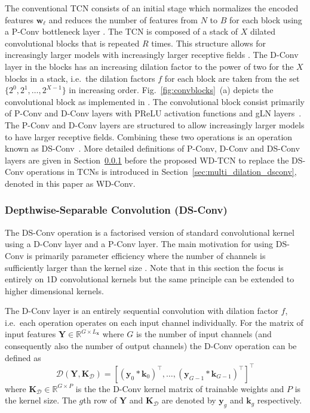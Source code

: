 \documentclass{article}
\newcommand{\vek}[1]{\ensuremath{\mathbf{#1}}}    \newcommand{\vekc}[1]{\ensuremath{\boldsymbol{\mathcal{#1}}}}
\newcommand{\Real}{\mathbb{R}}
\begin{document}
The conventional \ac{TCN} consists of an initial stage which normalizes the encoded features $\vek{w}_\ell$ and reduces the number of features from $N$ to $B$ for each block using a \ac{P-Conv} bottleneck layer \cite{convtasnet}.
The \ac{TCN} is composed of a stack of $X$ dilated convolutional blocks that is repeated $R$ times. This structure allows for increasingly larger models with increasingly larger receptive fields \cite{rfield}. The \ac{D-Conv} layer in the blocks has an increasing dilation factor to the power of two for the $X$ blocks in a stack, i.e.~the dilation factors $f$ for each block are taken from the set $\{2^0,2^1,\ldots,2^{X-1}\}$ in increasing order. Fig.~\ref{fig:convblocks}~(a) depicts the convolutional block as implemented in \cite{speechbrain,atttasnet}. 
The convolutional block consist primarily of \ac{P-Conv} and \ac{D-Conv} layers with \ac{PReLU} activation functions \cite{prelu} and \ac{gLN} layers~\cite{convtasnet}. The \ac{P-Conv} and \ac{D-Conv} layers are structured to allow increasingly larger models to have larger receptive fields. Combining these two operations is an operation known as \ac{DS-Conv}~\cite{convtasnet}. More detailed definitions of \ac{P-Conv}, \ac{D-Conv} and \ac{DS-Conv} layers are given in Section~\ref{sec:dsconv} before the proposed \ac{WD-TCN} to replace the \ac{DS-Conv} operations in \acp{TCN} is introduced in Section~\ref{sec:multi_dilation_dsconv}, denoted in this paper as \ac{WD-Conv}.
\subsubsection{Depthwise-Separable Convolution (DS-Conv)}
\label{sec:dsconv}
The \ac{DS-Conv} operation is a factorised version of standard convolutional kernel using a \ac{D-Conv} layer and a \ac{P-Conv} layer. The main motivation for using \ac{DS-Conv} is primarily parameter efficiency where the number of channels is sufficiently larger than the kernel size \cite{convtasnet}. Note that in this section the focus is entirely on 1D convolutional kernels but the same principle can be extended to higher dimensional kernels.

The \ac{D-Conv} layer is an entirely sequential convolution with dilation factor $f$, i.e.~each operation operates on each input channel individually. For the matrix of input features $\vek{Y}\in\Real^{G \times L_{\vek{x}}}$ where $G$ is the number of input channels (and consequently also the number of output channels) the \ac{D-Conv} operation can be defined as
\begin{equation}
    \mathcal{D}(\vek{Y},\vek{K}_{\mathcal{D}})=\left[(\vek{y}_0 * {\vek{k}}_0)^{\top},\ldots,({\vek{y}}_{G-1} * {\vek{k}}_{G-1})^{\top}\right]^{\top}
\end{equation}
where $\vek{K}_{\mathcal{D}}\in\mathbb{R}^{G \times P}$ is the the \ac{D-Conv} kernel matrix of trainable weights and $P$ is the kernel size. The $g$th row of $\vek{Y}$ and $\vek{K}_\mathcal{D}$ are denoted by $\vek{y}_g$ and $\vek{k}_g$ respectively. 
\end{document}
